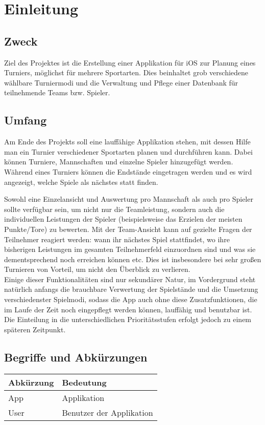 \chapter{Einleitung}
\section{Zweck}
Ziel des Projektes ist die Erstellung einer Applikation für iOS zur Planung eines Turniers, möglichst für mehrere Sportarten. Dies beinhaltet grob verschiedene wählbare Turniermodi und die Verwaltung und Pflege einer Datenbank für teilnehmende Teams bzw. Spieler.

\section{Umfang}
Am Ende des Projekts soll eine lauffähige Applikation stehen, mit dessen Hilfe man ein Turnier verschiedener Sportarten planen und durchführen kann. Dabei können Turniere, Mannschaften und einzelne Spieler hinzugefügt werden.
Während eines Turniers können die Endstände eingetragen werden und es wird angezeigt, welche Spiele als nächstes statt finden. 

Sowohl eine Einzelansicht und Auswertung pro Mannschaft als auch pro Spieler sollte verfügbar sein, um nicht nur die Teamleistung, sondern auch die individuellen Leistungen der Spieler (beispielsweise das Erzielen der meisten Punkte/Tore) zu bewerten. Mit der Team-Ansicht kann auf gezielte Fragen der Teilnehmer reagiert werden: wann ihr nächstes Spiel stattfindet, wo ihre bisherigen Leistungen im gesamten Teilnehmerfeld einzuordnen sind und was sie dementsprechend noch erreichen können etc. Dies ist insbesondere bei sehr großen Turnieren von Vorteil, um nicht den Überblick zu verlieren. \\
Einige dieser Funktionalitäten sind nur sekundärer Natur, im Vordergrund steht natürlich anfangs die brauchbare Verwertung der Spielstände und die Umsetzung verschiedenster Spielmodi, sodass die App auch ohne diese Zusatzfunktionen, die im Laufe der Zeit noch eingepflegt werden können, lauffähig und benutzbar ist. 
Die Einteilung in die unterschiedlichen Prioritätsstufen erfolgt jedoch zu einem späteren Zeitpunkt.
\section{Begriffe und Abkürzungen}

	\begin{tabular}{| l | l |}
		\hline
		Abkürzung & Bedeutung\\
		\hline
		App & Applikation\\
		User & Benutzer der Applikation \\
		\hline
	\end{tabular}

